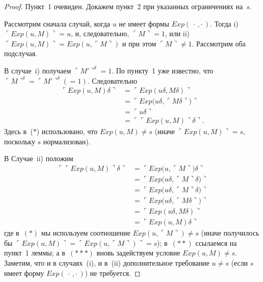 \begin{proof}
Пункт~1 очевиден.  
Докажем пункт~2 при указанных ограничениях на~$s$.

Рассмотрим сначала случай, когда $u$ \emph{не} имеет формы
$ Exp(\,\cdot\,,\cdot\,)$.  
Тогда i) $ \ulcorner Exp(u,M) \urcorner=u$, и, следовательно, $\ulcorner M\urcorner =1$, или ii) $\ulcorner Exp(u,M)\urcorner =  Exp(u,\ulcorner M \urcorner)$
      и при этом $\ulcorner M\urcorner\neq 1$. Рассмотрим оба подслучая.

В случае~i) получаем $\ulcorner M'\urcorner^{\delta}=1$.
По пункту~1 уже известно, что
$\ulcorner M\urcorner^{\delta}= \ulcorner M'\urcorner^{\delta}(=1)$.
Следовательно
\begin{align*}
  \ulcorner Exp(u,M)\delta\urcorner
    &= \ulcorner Exp(u\delta,M\delta)\urcorner\tag{*} \\
    &= \ulcorner Exp\bigl(u\delta,\ulcorner M\delta\urcorner\bigr)\urcorner \\[2pt]
    &= \ulcorner u\delta\urcorner \\[2pt]
    &= \ulcorner\ulcorner Exp(u,M)\urcorner\delta\urcorner .
\end{align*}
Здесь в~($\ast$) использовано, что $Exp(u,M)\neq s$
(иначе $\ulcorner Exp(u,M)\urcorner = s$, поскольку $s$ нормализован).


\medskip
В Случае~ii) положим
\begin{align*}
\ulcorner\ulcorner Exp(u,M)\urcorner\delta\urcorner
   &= \ulcorner Exp\!\bigl(u,\ulcorner M\urcorner\bigr)\delta\urcorner\\
   &= \ulcorner Exp\!\bigl(u \delta,\ulcorner M\urcorner\delta\bigr)\urcorner
      \tag{*}\\
   &= \ulcorner Exp\!\bigl(u \delta,\ulcorner M\urcorner\delta\bigr)\urcorner\\
   &= \ulcorner Exp\!\bigl(u\delta,\ulcorner M\delta\urcorner\bigr)\urcorner
      \tag{**}\\
   &= \ulcorner Exp(u\delta,M\delta)\urcorner\\
   &= \ulcorner Exp(u,M)\delta\urcorner
      \tag{***}
\end{align*}
где в~$(\ast)$ мы используем соотношение $Exp(u,\ulcorner M \urcorner)\neq s$
(иначе получилось бы $\ulcorner Exp(u,M)\urcorner=\ulcorner Exp(u,\ulcorner M \urcorner)\urcorner=s$);
в~$(\ast\ast)$ ссылаемся на пункт~1 леммы;
а в~$(\ast\ast\ast)$ вновь задействуем условие $Exp(u,M)\neq s$.
Заметим, что и в случаях~(i), и в~(ii) дополнительное требование
$u\neq s$ (если $s$ имеет форму $Exp(\,\cdot\,,\cdot\,)$) не требуется.


\end{proof}

